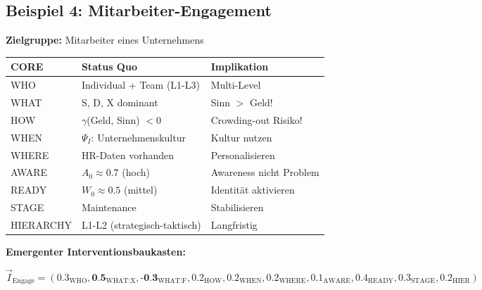 \subsection{Beispiel 4: Mitarbeiter-Engagement}
\label{sec:17-example-engagement}

\begin{tcolorbox}[colback=green!5!white, colframe=green!75!black,
    title=\textbf{10C Status Quo: Mitarbeiter-Engagement}]

\textbf{Zielgruppe:} Mitarbeiter eines Unternehmens

\begin{center}
\renewcommand{\arraystretch}{1.2}
\small
\begin{tabular}{@{}lll@{}}
\toprule
\textbf{CORE} & \textbf{Status Quo} & \textbf{Implikation} \\
\midrule
WHO & Individual + Team (L1-L3) & Multi-Level \\
WHAT & S, D, X dominant & Sinn $>$ Geld! \\
HOW & $\gamma$(Geld, Sinn) $< 0$ & Crowding-out Risiko! \\
WHEN & $\Psi_I$: Unternehmenskultur & Kultur nutzen \\
WHERE & HR-Daten vorhanden & Personalisieren \\
AWARE & $A_0 \approx 0.7$ (hoch) & Awareness nicht Problem \\
READY & $W_0 \approx 0.5$ (mittel) & Identit\"{a}t aktivieren \\
STAGE & Maintenance & Stabilisieren \\
HIERARCHY & L1-L2 (strategisch-taktisch) & Langfristig \\
\bottomrule
\end{tabular}
\end{center}

\end{tcolorbox}

\textbf{Emergenter Interventionsbaukasten:}

\begin{equation}
\vec{I}_{\text{Engage}} = (0.3_{\text{WHO}}, \textbf{0.5}_{\text{WHAT:X}}, \textbf{-0.3}_{\text{WHAT:F}}, 0.2_{\text{HOW}}, 0.2_{\text{WHEN}}, 0.2_{\text{WHERE}}, 0.1_{\text{AWARE}}, 0.4_{\text{READY}}, 0.3_{\text{STAGE}}, 0.2_{\text{HIER}})
\end{equation}

